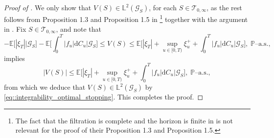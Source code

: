 \documentclass[10pt]{article} %
\newcommand\cG{\mathcal G}
\newcommand\cT{\mathcal T}
\def \E{\mathbb{E}}
\def \L{\mathbb{L}}
\def \P{\mathbb{P}}
\newcommand{\1}{\mathbf{1}}
\def\d{\mathrm{d}}
\begin{document}
\begin{proof}[Proof of ]
	We only show that $V(S) \in \L^2(\cG_S)$, for each $S \in \cT_{0,\infty}$, as the rest follows from Proposition 1.3 and Proposition 1.5 in \cite{kobylanski2012optimal}\footnote{The fact that the filtration is complete and the horizon is finite in \cite{kobylanski2012optimal} is not relevant for the proof of their Proposition 1.3 and Proposition 1.5.} together with the argument in \cite[Footnote 4]{grigorova2020optimal}. Fix $S \in \cT_{0,\infty}$, and note that
	\begin{equation*}
		-\E\big[|\xi_T|\big| \cG_S\big] - \E\bigg[\int_0^T|f_u|\d C_u \bigg| \cG_S\bigg] \leq V(S) \leq \E\bigg[ |\xi_T| + \sup_{u \in [0,T)} \xi^+_{u} + \int_0^T |f_u| \d C_u \bigg|\cG_S\bigg], \; \text{$\P$--a.s.},
	\end{equation*}
	implies
	\begin{equation*}
		|V(S)| \leq \E\bigg[ |\xi_T| + \sup_{u \in [0,T)} \xi^+_u + \int_0^T |f_u| \d C_u \bigg|\cG_S\bigg], \; \text{$\P$--a.s.},
	\end{equation*}
	from which we deduce that $V(S) \in \L^2(\cG_S)$ by \eqref{eq::integrability_optimal_stopping}. This completes the proof.
\end{proof}
\end{document}
